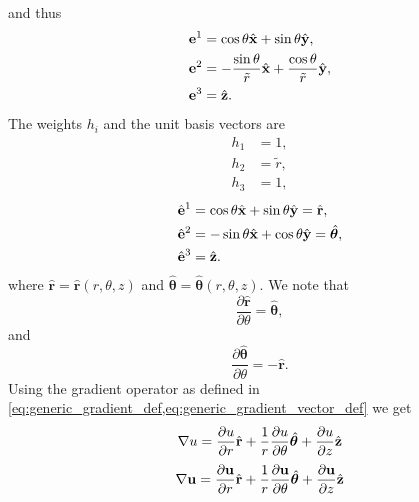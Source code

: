 \documentclass[11pt]{article}
\newcommand{\rtilde}{\tilde{r}}
\newcommand{\boldrhat}{\hat{\mathbf{r}}}
\newcommand{\boldthetahat}{\hat{\boldsymbol{\theta}}}
\begin{document}
and thus
\begin{align}
    \evec^{1} &= \cos \theta \hat{\xvec} + \sin \theta \hat{\yvec}, \\
    \evec^{2} &= -\frac{\sin \theta}{\rtilde} \hat{\xvec} + \frac{\cos \theta}{\rtilde} \hat{\yvec},  \\
    \evec^{3} &= \hat{\zvec}. 
\end{align}
The weights $h_i$ and the unit basis vectors are
\begin{align}
    h_1 &= 1, \\
    h_2 &= \rtilde, \\
    h_3 &= 1,
\end{align}
\begin{align}
    \hat{\evec}^{1} &= \cos \theta \hat{\xvec} + \sin \theta \hat{\yvec} = \boldrhat, \label{eq:cyl_e1} \\
    \hat{\evec}^{2} &= -\sin \theta \hat{\xvec} + \cos \theta \hat{\yvec} = \boldthetahat, \label{eq:cyl_e2} \\
    \hat{\evec}^{3} &= \hat{\zvec}. 
\end{align}
where $\boldrhat = \boldrhat(r, \theta, z)$ and $\boldthetahat = \boldthetahat(r, \theta, z)$. We note that 
\begin{equation}
    \frac{ \partial \boldrhat }{ \partial \theta } = \boldthetahat,
\end{equation}
and 
\begin{equation}
    \frac{\partial \boldthetahat }{ \partial \theta} = -\boldrhat.
\end{equation}
Using the gradient operator as defined in \cref{eq:generic_gradient_def,eq:generic_gradient_vector_def} we get 
\begin{equation}
    \nabla u = \frac{\partial u }{\partial r} \boldrhat + \frac{1}{r} \frac{\partial u }{\partial \theta} \boldthetahat + \frac{\partial u }{\partial z} \hat{\zvec}
\end{equation}
\begin{equation}
    \nabla \uvec = \frac{\partial \uvec }{\partial r} \boldrhat + \frac{1}{r} \frac{\partial \uvec }{\partial \theta} \boldthetahat + \frac{\partial \uvec }{\partial z} \hat{\zvec}
\end{equation}
\end{document}
